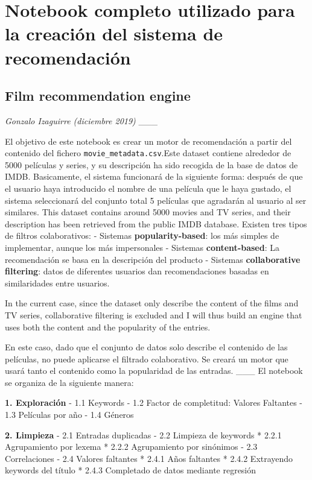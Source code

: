 \chapter{Notebook completo utilizado para la creación del sistema de recomendación}\label{app:one}




    \section{\texorpdfstring{\textbf{Film recommendation
engine}}{Film recommendation engine}}\label{film-recommendation-engine}

\emph{Gonzalo Izaguirre (diciembre 2019)} \_\_\_

El objetivo de este notebook es crear un motor de recomendación a partir
del contenido del fichero \texttt{movie\_metadata.csv}.Este dataset
contiene alrededor de 5000 películas y series, y su descripción ha sido
recogida de la base de datos de IMDB. Basicamente, el sistema funcionará
de la siguiente forma: después de que el usuario haya introducido el
nombre de una película que le haya gustado, el sistema seleccionará del
conjunto total 5 películas que agradarán al usuario al ser similares.
This dataset contains around 5000 movies and TV series, and their
description has been retrieved from the public IMDB database. Existen
tres tipos de filtros colaborativos: - Sistemas
\textbf{popularity-based}: los más simples de implementar, aunque los
más impersonales - Sistemas \textbf{content-based}: La recomendación se
basa en la descripción del producto - Sistemas \textbf{collaborative
filtering}: datos de diferentes usuarios dan recomendaciones basadas en
similaridades entre usuarios.

In the current case, since the dataset only describe the content of the
films and TV series, collaborative filtering is excluded and I will thus
build an engine that uses both the content and the popularity of the
entries.

En este caso, dado que el conjunto de datos solo describe el contenido
de las películas, no puede aplicarse el filtrado colaborativo. Se creará
un motor que usará tanto el contenido como la popularidad de las
entradas. \_\_\_ El notebook se organiza de la siguiente manera:

\textbf{1. Exploración} - 1.1 Keywords - 1.2 Factor de completitud:
Valores Faltantes - 1.3 Películas por año - 1.4 Géneros

\textbf{2. Limpieza} - 2.1 Entradas duplicadas - 2.2 Limpieza de
keywords * 2.2.1 Agrupamiento por lexema * 2.2.2 Agrupamiento por
sinónimos - 2.3 Correlaciones - 2.4 Valores faltantes * 2.4.1 Años
faltantes * 2.4.2 Extrayendo keywords del título * 2.4.3 Completado de
datos mediante regresión

